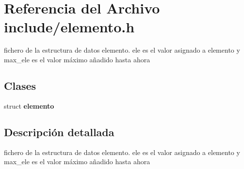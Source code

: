 \section{Referencia del Archivo include/elemento.h}
\label{elemento_8h}


fichero de la estructura de datos elemento. ele es el valor asignado a elemento y max\+\_\+ele es el valor máximo añadido hasta ahora  


\subsection*{Clases}
\begin{DoxyCompactItemize}
\item 
struct {\bf elemento}
\end{DoxyCompactItemize}


\subsection{Descripción detallada}
fichero de la estructura de datos elemento. ele es el valor asignado a elemento y max\+\_\+ele es el valor máximo añadido hasta ahora 

